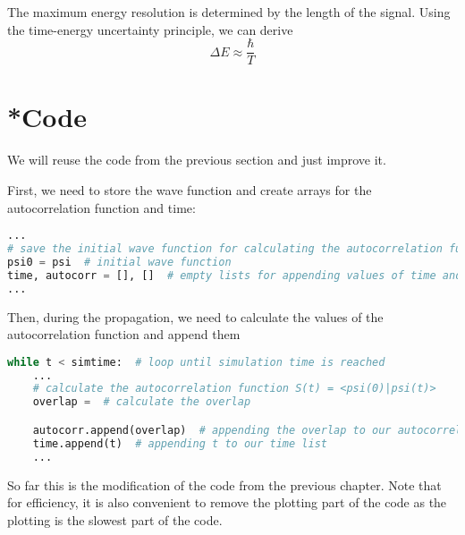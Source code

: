\hline
The maximum energy resolution is determined by the length of the signal. Using the time-energy uncertainty principle, we can derive
\begin{equation}
    \Delta E \approx \frac{\hbar}{T}
\end{equation}


\section{*Code}

We will reuse the code from the previous section and just improve it.

First, we need to store the wave function and create arrays for the autocorrelation function and time:
\begin{lstlisting}[language=Python, style=mystyle2]
...
# save the initial wave function for calculating the autocorrelation function
psi0 = psi  # initial wave function
time, autocorr = [], []  # empty lists for appending values of time and autocorrelation function
...
\end{lstlisting}

Then, during the propagation, we need to calculate the values of the autocorrelation function and append them
\begin{lstlisting}[language=Python, style=mystyle2]
while t < simtime:  # loop until simulation time is reached
    ... 
    # calculate the autocorrelation function S(t) = <psi(0)|psi(t)>
    overlap =  # calculate the overlap

    autocorr.append(overlap)  # appending the overlap to our autocorrelation function list
    time.append(t)  # appending t to our time list
    ...
\end{lstlisting}

So far this is the modification of the code from the previous chapter. Note that for efficiency, it is also convenient to remove the plotting part of the code as the plotting is the slowest part of the code.

